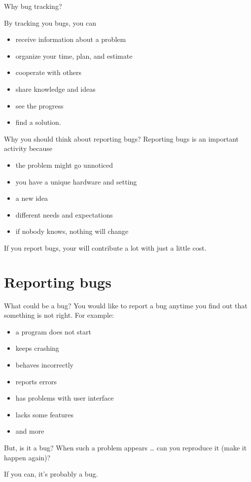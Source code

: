 \documentclass[12pt]{beamer}
\begin{document}
\begin{frame}{Why bug tracking?}

By tracking you bugs, you can

\begin{itemize}
	\item receive information about a problem
	\item organize your time, plan, and estimate
	\item cooperate with others
	\item share knowledge and ideas
	\item see the progress
	\item find a solution.
\end{itemize}
\end{frame}

\begin{frame}{Why you should think about reporting bugs?}
Reporting bugs is an important activity because
\begin{itemize}
	\item the problem might go unnoticed
	\item you have a unique hardware and setting
	\item a new idea
	\item different needs and expectations
	\item if nobody knows, nothing will change
\end{itemize}
If you report bugs, your will contribute a lot with just a little cost.
\end{frame}

\section{Reporting bugs}

\begin{frame}{What could be a bug?}
You would like to report a bug anytime you find out that something is not right. For example:
\begin{itemize}
	\item a program does not start
	\item keeps crashing
	\item behaves incorrectly
	\item reports errors
	\item has problems with user interface
	\item lacks some features
	\item and more
\end{itemize}
\end{frame}

\begin{frame}{But, is it a bug?}
 When such a problem appears \ldots{} \linebreak can you reproduce it (make it happen again)?

\vspace{15pt}

 {\Large \color{red}If you can, it's probably a bug.}
\end{frame}
\end{document}
